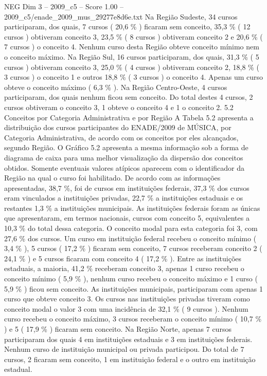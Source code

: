 \begin{textsample}{NEG Dim 3 – 2009\_c5 – Score 1.00 – 2009\_c5/enade\_2009\_mus\_29277e8d6e.txt}
Na Região Sudeste, 34 cursos participaram, dos quais, 7 cursos ( 20,6 \% ) ficaram sem conceito, 35,3 \% ( 12 cursos ) obtiveram conceito 3, 23,5 \% ( 8 cursos ) obtiveram conceito 2 e 20,6 \% ( 7 cursos ) o conceito 4.
Nenhum curso desta Região obteve conceito mínimo nem o conceito máximo.
Na Região Sul, 16 cursos participaram, dos quais, 31,3 \% ( 5 cursos ) obtiveram conceito 3, 25,0 \% ( 4 cursos ) obtiveram conceito 2, 18,8 \% ( 3 cursos ) o conceito 1 e outros 18,8 \% ( 3 cursos ) o conceito 4.
Apenas um curso obteve o conceito máximo ( 6,3 \% ).
Na Região Centro-Oeste, 4 cursos participaram, dos quais nenhum ficou sem conceito.
Do total destes 4 cursos, 2 cursos obtiveram o conceito 3, 1 obteve o conceito 4 e 1 o conceito 2. 5.2 Conceitos por Categoria Administrativa e por Região A Tabela 5.2 apresenta a distribuição dos cursos participantes do ENADE/2009 de MÚSICA, por Categoria Administrativa, de acordo com os conceitos por eles alcançados, segundo Região.
O Gráfico 5.2 apresenta a mesma informação sob a forma de diagrama de caixa para uma melhor visualização da dispersão dos conceitos obtidos.
Somente eventuais valores atípicos aparecem com o identificador da Região na qual o curso foi habilitado.
De acordo com as informações apresentadas, 38,7 \%, foi de cursos em instituições federais, 37,3 \% dos cursos eram vinculados a instituições privadas, 22,7 \% a instituições estaduais e os restantes 1,3 \% a instituições municipais.
As instituições federais foram as únicas que apresentaram, em termos nacionais, cursos com conceito 5, equivalentes a 10,3 \% do total dessa categoria.
O conceito modal para esta categoria foi 3, com 27,6 \% dos cursos.
Um curso em instituição federal recebeu o conceito mínimo ( 3,4 \% ), 5 cursos ( 17,2 \% ) ficaram sem conceito, 7 cursos receberam conceito 2 ( 24,1 \% ) e 5 cursos ficaram com conceito 4 ( 17,2 \% ).
Entre as instituições estaduais, a maioria, 41,2 \% receberam conceito 3, apenas 1 curso recebeu o conceito mínimo ( 5,9 \% ), nenhum curso recebeu o conceito máximo e 1 curso ( 5,9 \% ) ficou sem conceito.
As instituições municipais, participaram com apenas 1 curso que obteve conceito 3.
Os cursos nas instituições privadas tiveram como conceito modal o valor 3 com uma incidência de 32,1 \% ( 9 cursos ).
Nenhum curso recebeu o conceito máximo, 3 cursos receberam o conceito mínimo ( 10,7 \% ) e 5 ( 17,9 \% ) ficaram sem conceito.
Na Região Norte, apenas 7 cursos participaram dos quais 4 em instituições estaduais e 3 em instituições federais.
Nenhum curso de instituição municipal ou privada participou.
Do total de 7 cursos, 2 ficaram sem conceito, 1 em instituição federal e o outro em instituição estadual.

\end{textsample}
